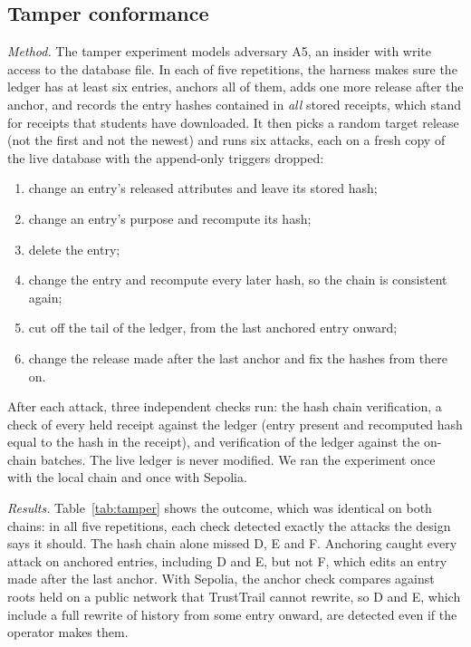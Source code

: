 \subsection{Tamper conformance}
\label{sec:eval-tamper}
\emph{Method.} The tamper experiment models adversary A5, an insider with write access to the database file. In each of five repetitions, the harness makes sure the ledger has at least six entries, anchors all of them, adds one more release after the anchor, and records the entry hashes contained in \emph{all} stored receipts, which stand for receipts that students have downloaded. It then picks a random target release (not the first and not the newest) and runs six attacks, each on a fresh copy of the live database with the append-only triggers dropped:
\begin{enumerate}
\item[A.] change an entry's released attributes and leave its stored hash;
\item[B.] change an entry's purpose and recompute its hash;
\item[C.] delete the entry;
\item[D.] change the entry and recompute every later hash, so the chain is consistent again;
\item[E.] cut off the tail of the ledger, from the last anchored entry onward;
\item[F.] change the release made after the last anchor and fix the hashes from there on.
\end{enumerate}
After each attack, three independent checks run: the hash chain verification, a check of every held receipt against the ledger (entry present and recomputed hash equal to the hash in the receipt), and verification of the ledger against the on-chain batches. The live ledger is never modified. We ran the experiment once with the local chain and once with Sepolia.

\emph{Results.} Table~\ref{tab:tamper} shows the outcome, which was identical on both chains: in all five repetitions, each check detected exactly the attacks the design says it should. The hash chain alone missed D, E and F. Anchoring caught every attack on anchored entries, including D and E, but not F, which edits an entry made after the last anchor. With Sepolia, the anchor check compares against roots held on a public network that TrustTrail cannot rewrite, so D and E, which include a full rewrite of history from some entry onward, are detected even if the operator makes them.


